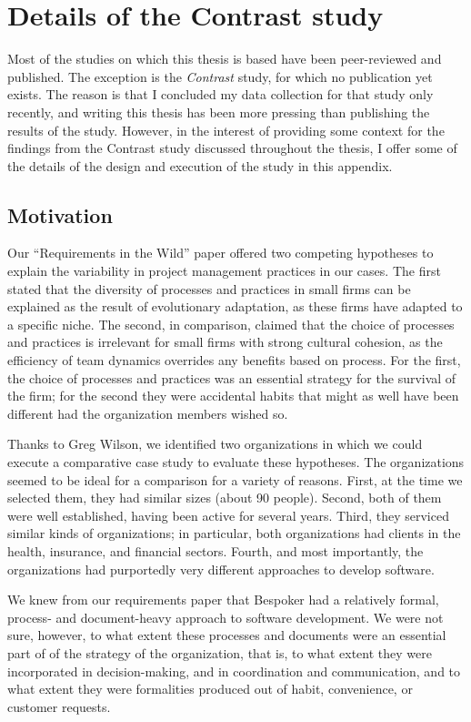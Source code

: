 \chapter{Details of the Contrast study}
\label{app:Contrast}

Most of the studies on which this thesis is based have been peer-reviewed and published. The exception is the \emph{Contrast} study, for which no publication yet exists. The reason is that I concluded my data collection for that study only recently, and writing this thesis has been more pressing than publishing the results of the study. However, in the interest of providing some context for the findings from the Contrast study discussed throughout the thesis, I offer some of the details of the design and execution of the study in this appendix.

\section{Motivation}

Our ``Requirements in the Wild'' paper \cite{Aranda2007} offered two competing hypotheses to explain the variability in project management practices in our cases. The first stated that the diversity of processes and practices in small firms can be explained as the result of evolutionary adaptation, as these firms have adapted to a specific niche. The second, in comparison, claimed that the choice of processes and practices is irrelevant for small firms with strong cultural cohesion, as the efficiency of team dynamics overrides any benefits based on process. For the first, the choice of processes and practices was an essential strategy for the survival of the firm; for the second they were accidental habits that might as well have been different had the organization members wished so.

Thanks to Greg Wilson, we identified two organizations in which we could execute a comparative case study to evaluate these hypotheses. The organizations seemed to be ideal for a comparison for a variety of reasons. First, at the time we selected them, they had similar sizes (about 90 people). Second, both of them were well established, having been active for several years. Third, they serviced similar kinds of organizations; in particular, both organizations had clients in the health, insurance, and financial sectors. Fourth, and most importantly, the organizations had purportedly very different approaches to develop software.

We knew from our requirements paper that Bespoker had a relatively formal, process- and document-heavy approach to software development. We were not sure, however, to what extent these processes and documents were an essential part of of the strategy of the organization, that is, to what extent they were incorporated in decision-making, and in coordination and communication, and to what extent they were formalities produced out of habit, convenience, or customer requests.

